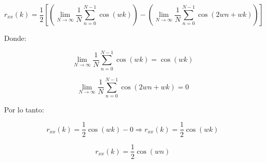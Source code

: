 \documentclass[12pt,a4paper]{article}
\begin{document}
\begin{equation}
r_{xx}(k) = \frac{1}{2} \left[\left(\lim_{N \to \infty} \frac{1}{N} \sum_{n=0}^{N-1} \cos(wk)\right) - \left(\lim_{N \to \infty} \frac{1}{N} \sum_{n=0}^{N-1} \cos(2wn+wk)\right)\right]
\end{equation}

Donde:

\begin{equation}
\lim_{N \to \infty} \frac{1}{N} \sum_{n=0}^{N-1} \cos(wk) = \boxed{\cos(wk)}
\end{equation}

\begin{equation}
\lim_{N \to \infty} \frac{1}{N} \sum_{n=0}^{N-1} \cos(2wn+wk) = \boxed{0}
\end{equation}

Por lo tanto:

\begin{equation}
r_{xx}(k) = \frac{1}{2} \cos(wk) - 0 \Rightarrow {r_{xx}(k) = \frac{1}{2} \cos(wk)}
\end{equation}

\begin{equation}
\boxed{r_{xx}(k) = \frac{1}{2} \cos(wn)}
\end{equation}
\end{document}
